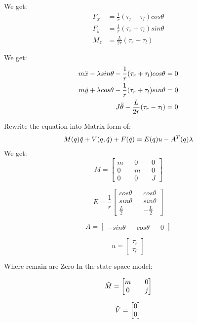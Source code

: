 We get:
\begin{equation}
\begin{split}
F_x &= \frac{1}{r} (\tau_r + \tau_l) cos \theta \\
F_y &= \frac{1}{r} (\tau_r + \tau_l) sin \theta \\
M_z &= \frac{L}{2r} (\tau_r - \tau_l)
\end{split}
\end{equation}

We get:
\begin{equation}
\begin{split}
m\Ddot{x} - \lambda sin \theta - \frac{1}{r} (\tau_r + \tau_l) cos \theta = 0\\
m\Ddot{y} + \lambda cos \theta - \frac{1}{r} (\tau_r + \tau_l) sin \theta = 0\\
J\Ddot{\theta} - \frac{L}{2r} (\tau_r - \tau_l) = 0
\end{split}
\end{equation}

Rewrite the equation into Matrix form of:
\[M(q)\Ddot{q} + V (q,\Dot{q}) + F(\Dot{q}) = E(q)u - A^T(q) \lambda\]
We get:
\[M=\begin{bmatrix}
m && 0 && 0\\
0 && m && 0\\ 
0 && 0 && J
\end{bmatrix}\]

\[E=\frac{1}{r}\begin{bmatrix}
cos\theta && cos\theta \\
sin\theta && sin\theta \\ 
\frac{L}{2} && -\frac{L}{2} 
\end{bmatrix}\]

\[A=\begin{bmatrix}
-sin\theta && cos\theta && 0
\end{bmatrix}\]

\[u=\begin{bmatrix}
\tau_r\\
\tau_l 
\end{bmatrix}\]

Where remain are Zero\newline
In the state-space model:

\[\Tilde{M}=\begin{bmatrix}
m && 0 \\
0 && j
\end{bmatrix}\]

\[\Tilde{V}=\begin{bmatrix}
0\\
0
\end{bmatrix}\]

